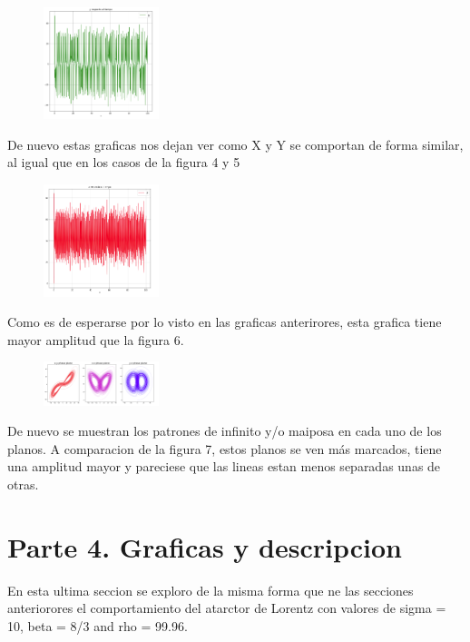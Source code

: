 \documentclass[a4paper]{article}
\begin{document}
\begin{figure}[ht!]
\centering
\includegraphics[width=0.3\textwidth]{D2.png}
\caption{\label{fig:}}
\end{figure}

De nuevo estas graficas nos dejan ver como X y Y se comportan de forma similar, al igual que en los casos de la figura 4 y 5 

\begin{figure}[ht!]
\centering
\includegraphics[width=0.3\textwidth]{E2.png}
\caption{\label{fig:}}
\end{figure}
\newpage

Como es de esperarse por lo visto en las graficas anterirores, esta grafica tiene mayor amplitud que la figura 6.   

\begin{figure}[ht!]
\centering
\includegraphics[width=0.3\textwidth]{F2.png}
\caption{\label{fig:}}
\end{figure}

De nuevo se muestran los patrones de infinito y/o maiposa en cada uno de los planos. A comparacion de la figura 7, estos planos se ven más marcados, tiene una amplitud mayor y pareciese que las lineas estan menos separadas unas de otras.  

\section{Parte 4. Graficas y descripcion}

En esta ultima seccion se exploro de la misma forma que ne las secciones anteriorores el comportamiento del atarctor de Lorentz con valores de sigma = 10, beta = 8/3 and rho = 99.96.
\end{document}
